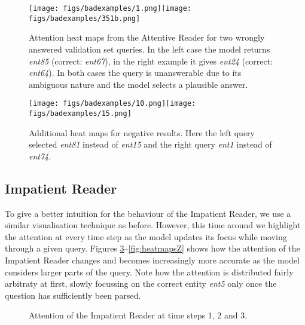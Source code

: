 \documentclass{article}
\begin{document}
\begin{figure}[t]
  \centering
  \texttt{[image: figs/badexamples/1.png]}\texttt{[image: figs/badexamples/351b.png]}
  \caption{
	   Attention heat maps from the Attentive Reader for two
           wrongly answered validation set queries. In the left case the model
           returns \textit{ent85} (correct: \textit{ent67}), in the right example
           it gives \textit{ent24} (correct: \textit{ent64}). In both cases the
           query is unanswerable due to its ambiguous nature and the model
           selects a plausible answer.
       }
  \label{fig:heatmapsC}
\end{figure}

\begin{figure}[t]
  \centering
  \texttt{[image: figs/badexamples/10.png]}\texttt{[image: figs/badexamples/15.png]}
  \caption{
	   Additional heat maps for negative results. Here the left query
           selected \textit{ent81} instead of \textit{ent15} and the right query
           \textit{ent1} instead of \textit{ent74}.
         }
  \label{fig:heatmapsD}
\end{figure}


\subsection{Impatient Reader}

To give a better intuition for the behaviour of the Impatient Reader, we use a
similar visualisation technique as before. However, this time around we
highlight the attention at every time step as the model updates its focus while
moving through a given query. Figures \ref{fig:heatmapsE}--\ref{fig:heatmapsZ} shows how the attention
of the Impatient Reader changes and becomes increasingly more accurate as the
model considers larger parts of the query.
Note how the attention is distributed
fairly arbitraty at first, slowly focussing on the correct entity
\textit{ent5} only once the question has sufficiently been parsed.

\begin{figure}[h]
  \centering
  \setlength{\fboxsep}{0pt}

  \caption{Attention of the Impatient Reader at time steps 1, 2 and 3.}
  \label{fig:heatmapsE}
\end{figure}
\end{document}
